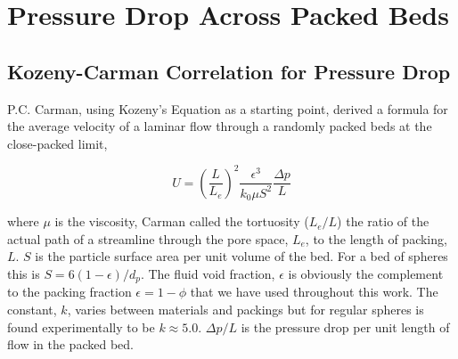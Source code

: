 \section{Pressure Drop Across Packed Beds} \label{sec:modeling-pressure-drop}






%
\subsection{Kozeny-Carman Correlation for Pressure Drop}
P.C. Carman\cite{Carman1997}, using Kozeny's Equation as a starting point, derived a formula for the average velocity of a laminar flow through a randomly packed beds at the close-packed limit,

\begin{equation}\label{eq:K-C-velocity}
	U = \left(\frac{L}{L_e}\right)^2\frac{\epsilon^3}{k_0\mu S^2}\frac{\Delta p}{L}
\end{equation}

where $\mu$ is the viscosity, Carman called the tortuosity ($L_e/L$) the ratio of the actual path of a streamline through the pore space, $L_e$, to the length of packing, $L$. $S$ is the particle surface area per unit volume of the bed. For a bed of spheres this is $S = 6(1-\epsilon)/d_p$. The fluid void fraction, $\epsilon$ is obviously the complement to the packing fraction $\epsilon = 1 - \phi$ that we have used throughout this work. The constant, $k$, varies between materials and packings but for regular spheres is found experimentally to be $k\approx 5.0$. $\Delta p/L$ is the pressure drop per unit length of flow in the packed bed.

